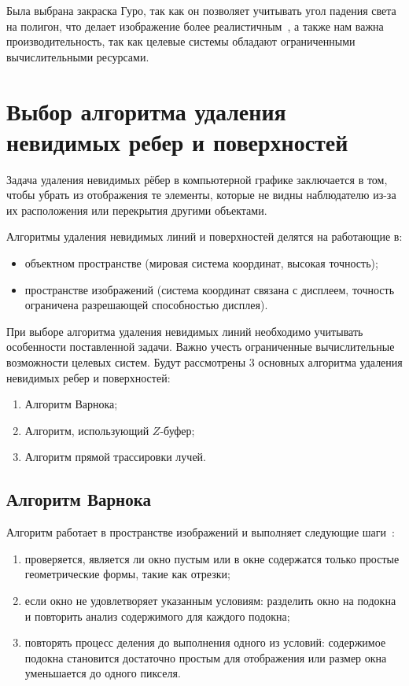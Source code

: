 Была выбрана закраска Гуро, так как он позволяет учитывать угол падения света на полигон, что делает изображение более реалистичным~\cite{Rodgers}, а также нам важна производительность, так как целевые системы обладают ограниченными вычислительными ресурсами.

\section{Выбор алгоритма удаления невидимых ребер и поверхностей}

Задача удаления невидимых рёбер в компьютерной графике заключается в том, чтобы убрать из отображения те элементы, которые не видны наблюдателю из-за их расположения или перекрытия другими объектами.

Алгоритмы удаления невидимых линий и поверхностей делятся на работающие в:
\begin{itemize}
	\item объектном пространстве (мировая система координат, высокая точность);
	\item пространстве изображений (система координат связана с дисплеем, точность ограничена разрешающей способностью дисплея).
\end{itemize}

При выборе алгоритма удаления невидимых линий необходимо учитывать особенности поставленной задачи. Важно учесть ограниченные вычислительные возможности целевых систем.
Будут рассмотрены 3 основных \cite{Invis comparison} алгоритма удаления невидимых ребер и поверхностей:

\begin{enumerate}
    \item Алгоритм Варнока;
    \item Алгоритм, использующий $Z$-буфер;
    \item Алгоритм прямой трассировки лучей.
\end{enumerate}

\subsection{Алгоритм Варнока}

Алгоритм работает в пространстве изображений и выполняет следующие шаги~\cite{Rodgers}:  

\begin{enumerate}  
    \item проверяется, является ли окно пустым или в окне содержатся только простые геометрические формы, такие как отрезки;
    \item если окно не удовлетворяет указанным условиям: разделить окно на подокна и повторить анализ содержимого для каждого подокна;
    \item повторять процесс деления до выполнения одного из условий: содержимое подокна становится достаточно простым для отображения или размер окна уменьшается до одного пикселя. 
\end{enumerate}  

